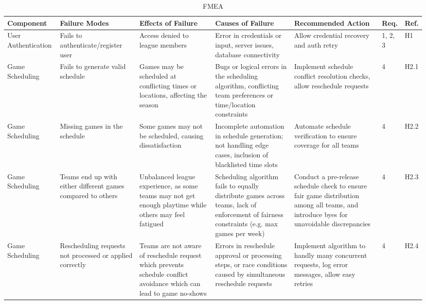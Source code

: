 \documentclass{article}
\begin{document}
\begin{landscape}
\begin{table}[hp]
    \caption{FMEA} \label{FMEA}
    \centering
    \begin{footnotesize}
    \begin{tabular}{|p{1in}|p{1in}|p{1in}|p{1.5in}|p{2.5in}|p{0.2in}|p{0.2in}|}
        \toprule
        \textbf{Component} & \textbf{Failure Modes} & \textbf{Effects of Failure} &\textbf{Causes of Failure}&\textbf{Recommended Action} &\textbf{Req.} &\textbf{Ref.} \\
        \bottomrule
        \hline
        
        User Authentication & 
        Fails to authenticate/register user
        & Access denied to league members & Error in credentials or input, server issues, database connectivity & Allow credential recovery and auth retry & 1, 2, 3 & H1 \\
        \hline
        Game Scheduling  & Fails to generate valid schedule & Games may be scheduled at conflicting times or locations, affecting the season & Bugs or logical errors in the scheduling algorithm, conflicting team preferences or time/location constraints & Implement schedule conflict resolution checks, allow reschedule requests & 4 & H2.1 \\
        \hline
        Game Scheduling  & Missing games in the schedule & Some games may not be scheduled, causing dissatisfaction & Incomplete automation in schedule generation; not handling edge cases, inclusion of blacklisted time slots & Automate schedule verification to ensure coverage for all teams & 4 & H2.2 \\
        \hline
        Game Scheduling  &  Teams end up with either different games compared to others & Unbalanced league experience, as some teams may not get enough playtime while others may feel fatigued & Scheduling algorithm fails to equally distribute games across teams, lack of enforcement of fairness constraints (e.g. max games per week) & Conduct a pre-release schedule check to ensure fair game distribution among all teams, and introduce byes for unavoidable discrepancies & 4 & H2.3 \\
        \hline
        Game Scheduling  & Rescheduling requests not processed or applied correctly  & Teams are not aware of reschedule request which prevents schedule conflict avoidance which can lead to game no-shows & Errors in reschedule approval or processing steps,  or race conditions caused by simultaneous reschedule requests & Implement algorithm to handly many concurrent requests, log error messages, allow easy retries  & 4 & H2.4 \\

\end{tabular}
\end{footnotesize}
\end{table}
\end{landscape}
\end{document}
